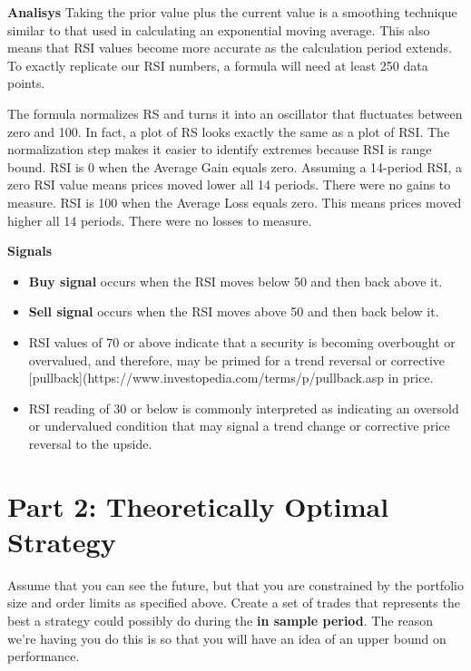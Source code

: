 \documentclass[11pt]{article}
\providecommand{\tightlist}{%
      \setlength{\itemsep}{0pt}\setlength{\parskip}{0pt}}
\begin{document}
\textbf{Analisys} Taking the prior value plus the current value is a
smoothing technique similar to that used in calculating an exponential
moving average. This also means that RSI values become more accurate as
the calculation period extends. To exactly replicate our RSI numbers, a
formula will need at least 250 data points.

The formula normalizes RS and turns it into an oscillator that
fluctuates between zero and 100. In fact, a plot of RS looks exactly the
same as a plot of RSI. The normalization step makes it easier to
identify extremes because RSI is range bound. RSI is 0 when the Average
Gain equals zero. Assuming a 14-period RSI, a zero RSI value means
prices moved lower all 14 periods. There were no gains to measure. RSI
is 100 when the Average Loss equals zero. This means prices moved higher
all 14 periods. There were no losses to measure.

\textbf{Signals}

\begin{itemize}
\tightlist
\item
  \textbf{Buy signal} occurs when the RSI moves below 50 and then back
  above it.
\item
  \textbf{Sell signal} occurs when the RSI moves above 50 and then back
  below it.
\item
  RSI values of 70 or above indicate that a security is becoming
  overbought or overvalued, and therefore, may be primed for a trend
  reversal or corrective
  {[}pullback{]}(https://www.investopedia.com/terms/p/pullback.asp in
  price.
\item
  RSI reading of 30 or below is commonly interpreted as indicating an
  oversold or undervalued condition that may signal a trend change or
  corrective price reversal to the upside.
\end{itemize}

    \section{Part 2: Theoretically Optimal
Strategy}\label{part-2-theoretically-optimal-strategy}

Assume that you can see the future, but that you are constrained by the
portfolio size and order limits as specified above. Create a set of
trades that represents the best a strategy could possibly do during the
\textbf{in sample period}. The reason we're having you do this is so
that you will have an idea of an upper bound on performance.
\end{document}
